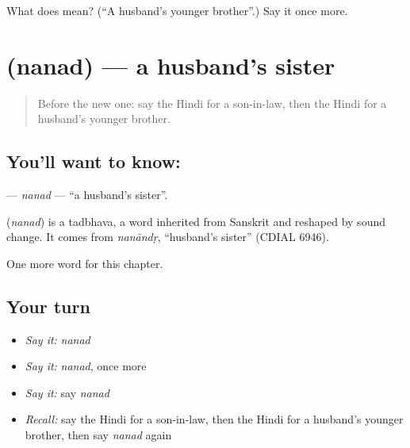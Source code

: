 \begin{tcolorbox}[breakable,colback=teal!4,colframe=teal!35!black,title={Before you move on}]
What does  mean? (\textquotedblleft{}A husband's younger brother\textquotedblright{}.) Say it once more.
\end{tcolorbox}
\section[\texorpdfstring{\hi{ननद} (nanad)}{ननद (nanad)}]{ (nanad) — a husband's sister}

\label{lesson:HI-C255-nanad}



\begin{quote}
Before the new one: say the Hindi for a son-in-law, then the Hindi for a husband's younger brother.
\end{quote}

\subsection*{You'll want to know: }
\textbf{} — \emph{nanad} — \textquotedblleft{}a husband's sister\textquotedblright{}.

\begin{cousinweb}
\textbf{} (\emph{nanad}) is a tadbhava, a word inherited from Sanskrit and reshaped by sound change. It comes from \emph{nanāndṛ}, \textquotedblleft{}husband's sister\textquotedblright{} (CDIAL 6946).
\end{cousinweb}

\begin{grammarlens}[title={What you've built}]
One more word for this chapter.
\end{grammarlens}

\subsection*{Your turn}
\begin{itemize}
\raggedright
  \item \emph{Say it:} \emph{nanad}
  \item \emph{Say it:} \emph{nanad}, once more
  \item \emph{Say it:} say \emph{nanad}
  \item \emph{Recall:} say the Hindi for a son-in-law, then the Hindi for a husband's younger brother, then say \emph{nanad} again
\end{itemize}


